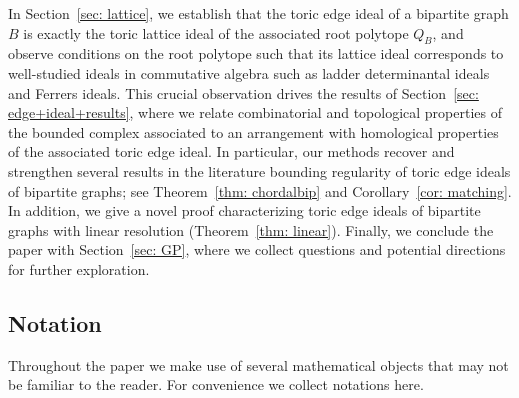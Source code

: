\documentclass[11pt]{article}
\theoremstyle{definition}
\numberwithin{equation}{section}
\begin{document}
In Section~\ref{sec: lattice}, we establish that the toric edge ideal of a bipartite graph $B$ is exactly the toric lattice ideal of the associated root polytope $Q_B$, and observe conditions on the root polytope such that its lattice ideal corresponds to well-studied ideals in commutative algebra such as ladder determinantal ideals and Ferrers ideals. This crucial observation drives the results of Section~\ref{sec: edge+ideal+results}, where we relate combinatorial and topological properties of the bounded complex associated to an arrangement with homological properties of the associated toric edge ideal. In particular, our methods recover and strengthen several results in the literature bounding regularity of toric edge ideals of bipartite graphs; see Theorem~\ref{thm: chordalbip} and Corollary~\ref{cor: matching}. In addition, we give a novel proof characterizing toric edge ideals of bipartite graphs with linear resolution (Theorem~\ref{thm: linear}). Finally, we conclude the paper with Section~\ref{sec: GP}, where we collect questions and potential directions for further exploration.

\subsection{Notation} Throughout the paper we make use of several mathematical objects that may not be familiar to the reader. For convenience we collect notations here.
\end{document}
